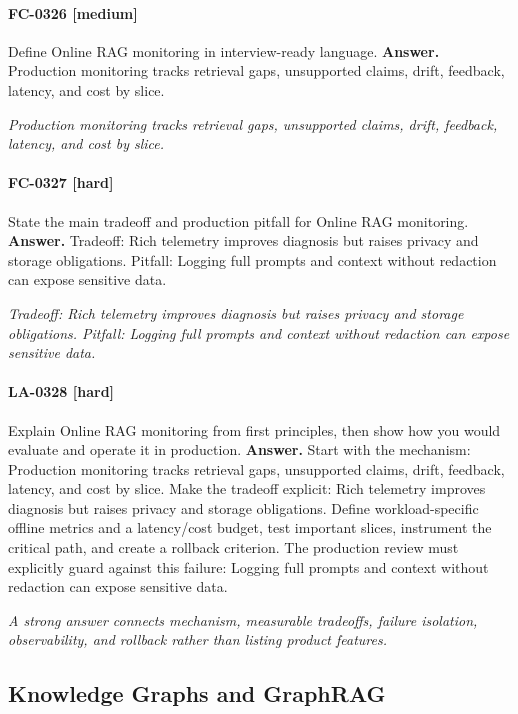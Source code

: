 \paragraph{FC-0326 [medium]} Define Online RAG monitoring in interview-ready language.
\noindent\textbf{Answer.} Production monitoring tracks retrieval gaps, unsupported claims, drift, feedback, latency, and cost by slice.
\par\textit{Production monitoring tracks retrieval gaps, unsupported claims, drift, feedback, latency, and cost by slice.}
\paragraph{FC-0327 [hard]} State the main tradeoff and production pitfall for Online RAG monitoring.
\noindent\textbf{Answer.} Tradeoff: Rich telemetry improves diagnosis but raises privacy and storage obligations. Pitfall: Logging full prompts and context without redaction can expose sensitive data.
\par\textit{Tradeoff: Rich telemetry improves diagnosis but raises privacy and storage obligations. Pitfall: Logging full prompts and context without redaction can expose sensitive data.}
\paragraph{LA-0328 [hard]} Explain Online RAG monitoring from first principles, then show how you would evaluate and operate it in production.
\noindent\textbf{Answer.} Start with the mechanism: Production monitoring tracks retrieval gaps, unsupported claims, drift, feedback, latency, and cost by slice. Make the tradeoff explicit: Rich telemetry improves diagnosis but raises privacy and storage obligations. Define workload-specific offline metrics and a latency/cost budget, test important slices, instrument the critical path, and create a rollback criterion. The production review must explicitly guard against this failure: Logging full prompts and context without redaction can expose sensitive data.
\par\textit{A strong answer connects mechanism, measurable tradeoffs, failure isolation, observability, and rollback rather than listing product features.}
\subsection{Knowledge Graphs and GraphRAG}
